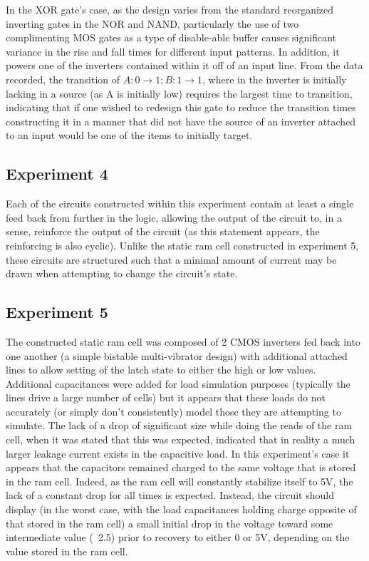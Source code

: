 \documentclass[10pt]{article}
\begin{document}
In the XOR gate's case, as the design varies from the standard reorganized
inverting gates in the NOR and NAND, particularly the use of two
complimenting MOS gates as a type of disable-able buffer causes significant
variance in the rise and fall times for different input patterns. In
addition, it powers one of the inverters contained within it off of an
input line. From the data recorded, the transition of $A:0 \rightarrow 1;
B:1 \rightarrow 1$, where in the inverter is initially lacking in a source
(as A is initially low) requires the largest time to transition, indicating
that if one wished to redesign this gate to reduce the transition times
constructing it in a manner that did not have the source of an
inverter attached to an input would be one of the items to initially
target.


\subsection{Experiment 4}

Each of the circuits constructed within this experiment contain at least a
single feed back from further in the logic, allowing the output of the
circuit to, in a sense, reinforce the output of the circuit (as this
statement appears, the reinforcing is also cyclic). Unlike the static ram
cell constructed in experiment 5, these circuits are structured such that
a minimal amount of current may be drawn when attempting to change the
circuit's state.

\subsection{Experiment 5}

The constructed static ram cell was composed of 2 CMOS inverters fed back into
one another (a simple bistable multi-vibrator design) with additional
attached lines to allow setting of the latch state to either the high or
low values. Additional capacitances were added for load simulation
purposes (typically the lines drive a large number of cells) but it
appears that these loads do not accurately (or simply don't consistently)
model those they are attempting to simulate. The lack of a drop of
significant size while doing the reads of the ram cell, when it was stated
that this was expected, indicated that in reality a much larger leakage
current exists in the capacitive load. In this experiment's case it
appears that the capacitors remained charged to the same voltage that is
stored in the ram cell. Indeed, as the ram cell will constantly stabilize
itself to 5V, the lack of a constant drop for all times is expected.
Instead, the circuit should display (in the worst case, with the load
capacitances holding charge opposite of that stored in the ram cell) a
small initial drop in the voltage toward some intermediate value (~2.5)
prior to recovery to either 0 or 5V, depending on the value stored in the
ram cell.

%
\end{document}
